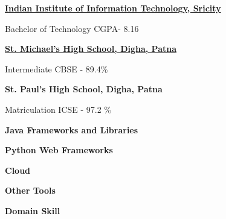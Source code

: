 \documentclass[10pt,a4paper]{altacv}
\begin{document}
\newcommand{\edu}[2]{%
  {\large\color{emphasis}\textbf{#1}\par}
  \smallskip\normalsize
  \ifstrequal{#2}{}{}{
  \color{accent}#2\par
  \smallskip}
  \normalsize
}




\edu{\href{http://www.iiits.ac.in/}{Indian Institute of Information Technology, Sricity}}{Bachelor of Technology \hspace{6} CGPA- 8.16}
\medskip
\medskip
\edu{\href{http://www.stmichaelspatna.edu.in/}{St. Michael's High School, Digha, Patna}}{Intermediate \hspace{6} CBSE - 89.4\% }
\medskip
\medskip
\edu{St. Paul's High School, Digha, Patna}{Matriculation \hspace{6} ICSE - 97.2 \% }






\textbf{Java Frameworks and Libraries}
\par\smallskip\smallskip
{}       
\medskip

\textbf{Python Web Frameworks}
\par\smallskip
{}  
\medskip



\textbf{Cloud}
\par\smallskip\smallskip
{} 
\medskip

\textbf{Other Tools\smallskip}
\par\smallskip
{} 
 
 
\medskip

\textbf{Domain Skill\smallskip}
\par\smallskip
{}   


\end{document}
